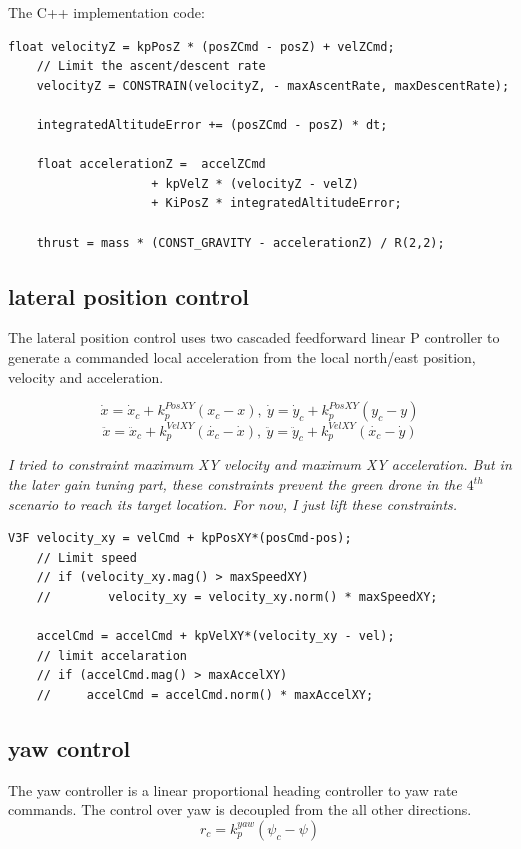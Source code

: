 \documentclass[a4paper]{article}
\begin{document}
The C++ implementation code:
\begin{lstlisting}[frame=single]
    float velocityZ = kpPosZ * (posZCmd - posZ) + velZCmd;
    // Limit the ascent/descent rate
    velocityZ = CONSTRAIN(velocityZ, - maxAscentRate, maxDescentRate);
    
    integratedAltitudeError += (posZCmd - posZ) * dt;
    
    float accelerationZ =  accelZCmd
                    + kpVelZ * (velocityZ - velZ)
                    + KiPosZ * integratedAltitudeError;
    
    thrust = mass * (CONST_GRAVITY - accelerationZ) / R(2,2);

\end{lstlisting}

\subsection{lateral position control} \label{control:lateral}
The lateral position control uses two cascaded feedforward linear P controller to generate a commanded local acceleration from the local north/east position, velocity and acceleration.

$$\dot{x} = \dot{x}_c  + k_{p}^{PosXY}(x_{c} - x), \:
  \dot{y} = \dot{y}_c  + k_{p}^{PosXY}(y_{c} - y)$$
$$\ddot{x} = \ddot{x}_c  + k_{p}^{VelXY}(\dot{x_{c}} - \dot{x}), \:
  \ddot{y} = \ddot{y}_c  + k_{p}^{VelXY}(\dot{x_{c}} - \dot{y})$$

\textit{I tried to constraint maximum XY velocity and maximum XY acceleration. But in the later gain tuning part, these constraints prevent the green drone in the $4^{th}$ scenario to reach its target location. For now, I just lift these constraints.}

\begin{lstlisting}[frame=single]
    V3F velocity_xy = velCmd + kpPosXY*(posCmd-pos);
    // Limit speed
    // if (velocity_xy.mag() > maxSpeedXY)
    //        velocity_xy = velocity_xy.norm() * maxSpeedXY;
    
    accelCmd = accelCmd + kpVelXY*(velocity_xy - vel);
    // limit accelaration
    // if (accelCmd.mag() > maxAccelXY)
    //     accelCmd = accelCmd.norm() * maxAccelXY;
\end{lstlisting}

\subsection{yaw control} \label{control:yaw}
The yaw controller is a linear proportional heading controller to yaw rate commands.
The control over yaw is decoupled from the all other directions.
$$ r_c = k_p^{yaw} (\psi_c - \psi) $$
\end{document}
